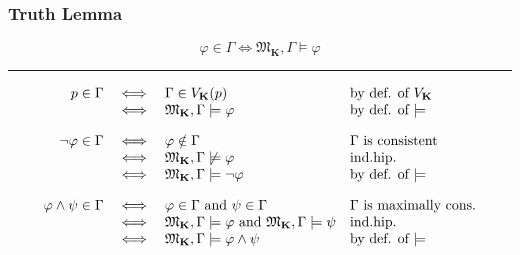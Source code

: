 \documentclass[xcolor=x11names]{beamer}
\begin{document}
\begin{frame}
\frametitle{Truth Lemma}

\[\varphi \in \Gamma \iff \mathfrak M_{\mathbf K}, \Gamma \models \varphi \]
\hrule
\medskip

\[\begin{array}{rcll}
p \in \Gamma &\iff& \Gamma \in V_\mathbf K (p) & \textup{by def. of $V_\mathbf K$}
\\ &\iff&\mathfrak M_{\mathbf K}, \Gamma \models \varphi& \textup{by def. of $\models$}
\\[1em] \lnot \varphi \in \Gamma &\iff& \varphi \notin \Gamma  & \textup{$\Gamma$ is consistent}
\\ &\iff&\mathfrak M_{\mathbf K}, \Gamma \not\models \varphi& \textup{ind.hip.}
\\ &\iff&\mathfrak M_{\mathbf K}, \Gamma \models \lnot \varphi& \textup{by def. of $\models$}
\\[1em] \varphi \land \psi \in \Gamma &\iff& \varphi\in \Gamma \textup{ and } \psi \in \Gamma & \textup{$\Gamma$ is maximally cons.}
\\ &\iff&\mathfrak M_{\mathbf K}, \Gamma \models \varphi \textup{ and } \mathfrak M_{\mathbf K}, \Gamma \models \psi& \textup{ind.hip.}
\\ &\iff&\mathfrak M_{\mathbf K}, \Gamma \models \varphi\land \psi& \textup{by def. of $\models$}
\end{array}\]

\end{frame}

\end{document}
